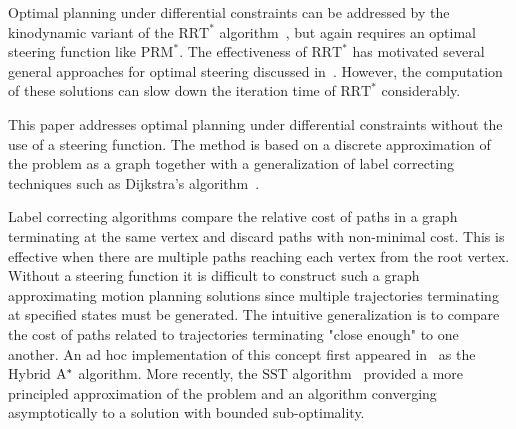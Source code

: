 \documentclass{llncs}
\newcommand{\PRMs}{\ensuremath{\mathrm{PRM}^*}\xspace}
\newcommand{\RRT}{\ensuremath{\mathrm{RRT}}\xspace}
\newcommand{\RRTs}{\ensuremath{\mathrm{RRT}^*}\xspace}
\newcommand{\SST}{\ensuremath{\mathrm{SST}}\xspace}
\newcommand{\EST}{\ensuremath{\mathrm{EST}}\xspace}
\begin{document}
%
Optimal planning under differential constraints can be addressed by the kinodynamic variant of the \RRTs algorithm~\cite{karaman2010optimal}, but again requires an optimal steering function like \PRMs. 
%
The effectiveness of \RRTs has motivated several general approaches for optimal steering discussed in~\cite{perez2012lqr,xie2015toward}.
%
However, the computation of these solutions can slow down the iteration time of \RRTs considerably.
%

%
%
%

%
This paper addresses optimal planning under differential constraints without the use of a steering function. 
%
The method is based on a discrete approximation of the problem as a graph together with a generalization of label correcting techniques such as Dijkstra's algorithm~\cite{dijkstra1959note}.
%

%
Label correcting algorithms compare the relative cost of paths in a graph terminating at the same vertex and discard paths with non-minimal cost.
%
This is effective when there are multiple paths reaching each vertex from the root vertex.
%
Without a steering function it is difficult to construct such a graph approximating motion planning solutions since multiple trajectories terminating at specified states must be generated.
%
The intuitive generalization is to compare the cost of paths related to trajectories terminating "close enough" to one another.
%
An ad hoc implementation of this concept first appeared in~\cite{fox1998hybrid} as the Hybrid $\rm A^*$ algorithm.
%
More recently, the \SST algorithm~\cite{Li2016Asymptotically-} provided a more principled approximation of the problem and an algorithm converging asymptotically to a solution with bounded sub-optimality. 
%
 
%
%
%
%
%
%
\end{document}
